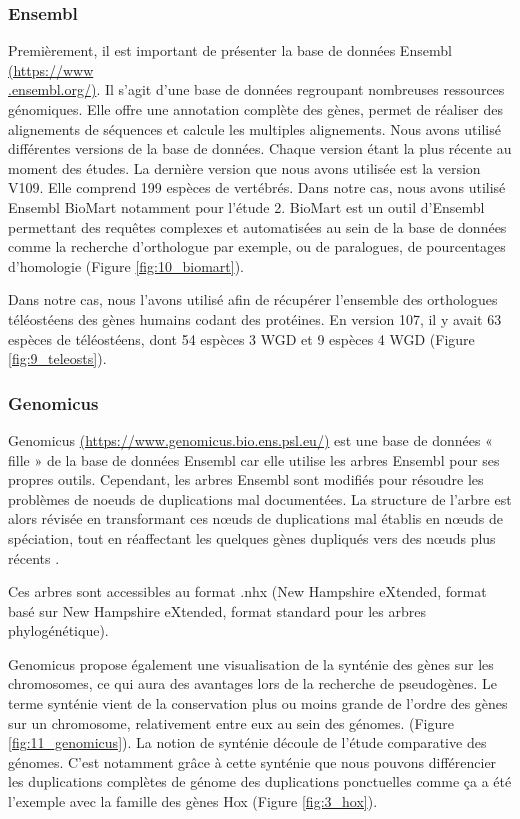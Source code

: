 \subsubsection{Ensembl}\label{ensembl}
\par Premièrement, il est important de présenter la base de données Ensembl \href{https://www.ensembl.org/}{(https://www\\.ensembl.org/)}. Il s’agit d’une base de données regroupant nombreuses ressources génomiques. Elle offre une annotation complète des gènes, permet de réaliser des alignements de séquences et calcule les multiples alignements. Nous avons utilisé différentes versions de la base de données. Chaque version étant la plus récente au moment des études. La dernière version que nous avons utilisée est la version V109. Elle comprend 199 espèces de vertébrés. Dans notre cas, nous avons utilisé Ensembl BioMart notamment pour l’étude 2. BioMart est un outil d’Ensembl permettant des requêtes complexes et automatisées au sein de la base de données comme la recherche d’orthologue par exemple, ou de paralogues, de pourcentages d’homologie (Figure \ref{fig:10_biomart}). 
\par Dans notre cas, nous l’avons utilisé afin de récupérer l’ensemble des orthologues téléostéens des gènes humains codant des protéines. En version 107, il y avait 63 espèces de téléostéens, dont 54 espèces 3 WGD et 9 espèces 4 WGD (Figure \ref{fig:9_teleosts}).

\subsubsection{Genomicus}\label{genomicus}
\par Genomicus \href{https://www.genomicus.bio.ens.psl.eu/}{(https://www.genomicus.bio.ens.psl.eu/)} est une base de données « fille » de la base de données Ensembl car elle utilise les arbres Ensembl pour ses propres outils. Cependant, les arbres Ensembl sont modifiés pour résoudre les problèmes de noeuds de duplications mal documentées. La structure de l'arbre est alors révisée en transformant ces nœuds de duplications mal établis en nœuds de spéciation, tout en réaffectant les quelques gènes dupliqués vers des nœuds plus récents \parencite{louis_genomicus_2015}.
\par Ces arbres sont accessibles au format .nhx (New Hampshire eXtended, format basé sur New Hampshire eXtended, format standard pour les arbres phylogénétique). 
\par Genomicus propose également une visualisation de la synténie des gènes sur les chromosomes, ce qui aura des avantages lors de la recherche de pseudogènes. Le terme synténie vient de la conservation plus ou moins grande de l’ordre des gènes sur un chromosome, relativement entre eux au sein des génomes. (Figure \ref{fig:11_genomicus}). La notion de synténie découle de l’étude comparative des génomes. C’est notamment grâce à cette synténie que nous pouvons différencier les duplications complètes de génome des duplications ponctuelles comme ça a été l’exemple avec la famille des gènes Hox (Figure \ref{fig:3_hox}). \newpage

